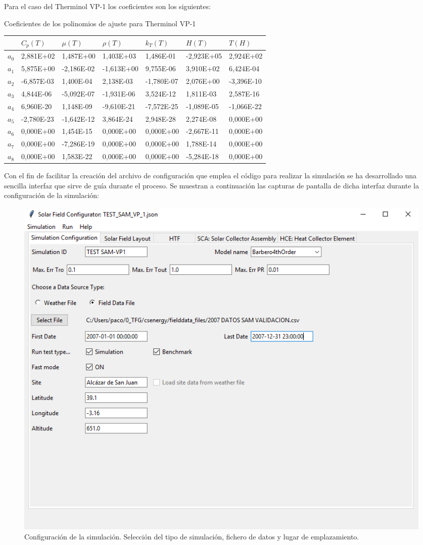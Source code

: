 \documentclass[12pt]{report} %
\begin{document}
Para el caso del Therminol VP-1 los coeficientes son los siguientes:

Coeficientes de los polinomios de ajuste para Therminol VP-1

\begin{longtable}[]{@{}lllllll@{}}

& \(C_p(T)\) & \(\mu(T)\) & \(\rho(T)\) & \(k_T(T)\) & \(H(T)\) &
\(T(H)\)\tabularnewline

\endhead
\(a_0\) & 2,881E+02 & 1,487E+00 & 1,403E+03 & 1,486E-01 & -2,923E+05 &
2,924E+02\tabularnewline
\(a_1\) & 5,875E+00 & -2,186E-02 & -1,613E+00 & 9,755E-06 & 3,910E+02 &
6,424E-04\tabularnewline
\(a_2\) & -6,857E-03 & 1,400E-04 & 2,138E-03 & -1,780E-07 & 2,076E+00 &
-3,396E-10\tabularnewline
\(a_3\) & 4,844E-06 & -5,092E-07 & -1,931E-06 & 3,524E-12 & 1,811E-03 &
2,587E-16\tabularnewline
\(a_4\) & 6,960E-20 & 1,148E-09 & -9,610E-21 & -7,572E-25 & -1,089E-05 &
-1,066E-22\tabularnewline
\(a_5\) & -2,780E-23 & -1,642E-12 & 3,864E-24 & 2,948E-28 & 2,274E-08 &
0,000E+00\tabularnewline
\(a_6\) & 0,000E+00 & 1,454E-15 & 0,000E+00 & 0,000E+00 & -2,667E-11 &
0,000E+00\tabularnewline
\(a_7\) & 0,000E+00 & -7,286E-19 & 0,000E+00 & 0,000E+00 & 1,788E-14 &
0,000E+00\tabularnewline
\(a_8\) & 0,000E+00 & 1,583E-22 & 0,000E+00 & 0,000E+00 & -5,284E-18 &
0,000E+00\tabularnewline

\end{longtable}

Con el fin de facilitar la creación del archivo de configuración que emplea el código para realizar la simulación se ha desarrollado una sencilla interfaz que sirve de guía durante el proceso. Se muestran a continuación las capturas de pantalla de dicha interfaz durante la configuración de la simulación: 

\begin{figure}
\includegraphics[scale=0.8]{images/interface01.png}
\caption{Configuración de la simulación. Selección del tipo de simulación, fichero de datos y lugar de emplazamiento.} 
\label{fig:interface01}
\end{figure}
\end{document}
